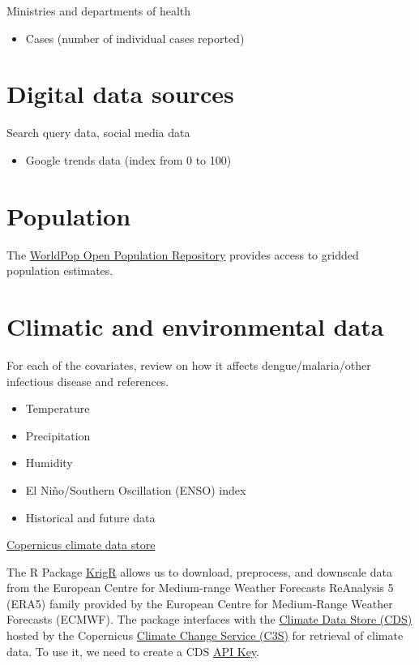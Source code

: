 \documentclass[
  letterpaper,
  DIV=11,
  numbers=noendperiod]{scrreprt}
\providecommand{\tightlist}{%
  \setlength{\itemsep}{0pt}\setlength{\parskip}{0pt}}\usepackage{longtable,booktabs,array}
\begin{document}
Ministries and departments of health

\begin{itemize}
\tightlist
\item
  Cases (number of individual cases reported)
\end{itemize}

\hypertarget{digital-data-sources}{%
\section{Digital data sources}\label{digital-data-sources}}

Search query data, social media data

\begin{itemize}
\tightlist
\item
  Google trends data (index from 0 to 100)
\end{itemize}

\hypertarget{population}{%
\section{Population}\label{population}}

The \href{https://wopr.worldpop.org/}{WorldPop Open Population
Repository} provides access to gridded population estimates.

\hypertarget{climatic-and-environmental-data}{%
\section{Climatic and environmental
data}\label{climatic-and-environmental-data}}

For each of the covariates, review on how it affects
dengue/malaria/other infectious disease and references.

\begin{itemize}
\tightlist
\item
  Temperature
\item
  Precipitation
\item
  Humidity
\item
  El Niño/Southern Oscillation (ENSO) index
\item
  Historical and future data
\end{itemize}

\href{https://cds.climate.copernicus.eu/}{Copernicus climate data store}

The R Package \href{https://github.com/ErikKusch/KrigR}{KrigR} allows us
to download, preprocess, and downscale data from the European Centre for
Medium-range Weather Forecasts ReAnalysis 5 (ERA5) family provided by
the European Centre for Medium‐Range Weather Forecasts (ECMWF). The
package interfaces with the
\href{https://cds.climate.copernicus.eu/\#!/home}{Climate Data Store
(CDS)} hosted by the Copernicus
\href{https://cds.climate.copernicus.eu/about-c3s}{Climate Change
Service (C3S)} for retrieval of climate data. To use it, we need to
create a CDS \href{https://cds.climate.copernicus.eu/api-how-to}{API
Key}.
\end{document}

